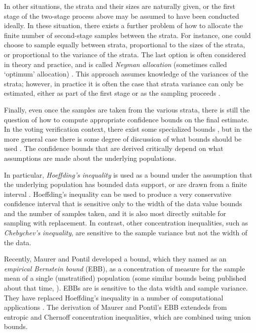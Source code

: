 \documentclass[]{interact}
\theoremstyle{plain}%
\theoremstyle{definition}
\theoremstyle{remark}
\begin{document}
In other situations, the strata and their sizes are naturally given, 
or the first stage of the two-stage process above may be assumed to have been conducted ideally.
In these situation, there exists a further problem of how to allocate the finite number of second-stage samples between the strata. 
For instance, one could choose to sample equally between strata, proportional to the sizes of the strata, or proportional to the variance of the strata.
The last option is often considered in theory and practice, and is called \textit{Neyman allocation} (sometimes called `optimum' allocation) \cite{1938.10503378,10.2307/23339498}. 
This approach assumes knowledge of the variances of the strata; however, in practice it is often the case that strata variance can only be estimated, either as part of the first stage or as the sampling proceeds \cite{etore2010,DBLP:journals/tsg/OBrienGR15}.

Finally, even once the samples are taken from the various strata, there is still the question of how to compute appropriate confidence bounds on the final estimate.
In the voting verification context, there exist some specialized bounds  \cite{Miratrix:2009:EAU:1720420.1720453,Bentkus2003}, but in the more general case there is some degree of discussion of what bounds should be used \cite{Stark:2009:RPA:1720420.1720456}.
The confidence bounds that are derived critically depend on what assumptions are made about the underlying populations.

In particular, \textit{Hoeffding's inequality} \cite{hoeffding1} is used as a bound under the assumption that the underlying population has bounded data support, or are drawn from a finite interval \cite{Bentkus2003,Stark:2009:RPA:1720420.1720456}.
Hoeffding's inequality can be used to produce a very conservative confidence interval that is sensitive only to the width of the data value bounds and the number of samples taken, and it is also most directly suitable for sampling with replacement. 
In contrast, other concentration inequalities, such as \textit{Chebychev's inequality}, 
are sensitive to the sample variance but not the width of the data.

Recently, Maurer and Pontil \cite{Maurer50empiricalbernstein} developed a bound, which they named as an \textit{empirical Bernstein bound} (EBB), as a concentration of measure for the sample mean of a single (unstratified) population
(some similar bounds being published about that time, \cite{zbMATH05552995,10.1007/978-3-540-75225-7_15}). 
EBBs are is sensitive to the data width and sample variance.
They have replaced Hoeffding's inequality in a number of computational applications \citep{Zia-UrRehman2012,Mnih:2008:EBS:1390156.1390241,DBLP:conf/aaai/ThomasTG15,Carpentier:2011:UAA:2050345.2050366}.
The derivation of Maurer and Pontil's EBB extendeds from entropic \cite{Maurer_concentrationinequalities} and Chernoff concentration inequalities, which are combined using union bounds.
\end{document}
